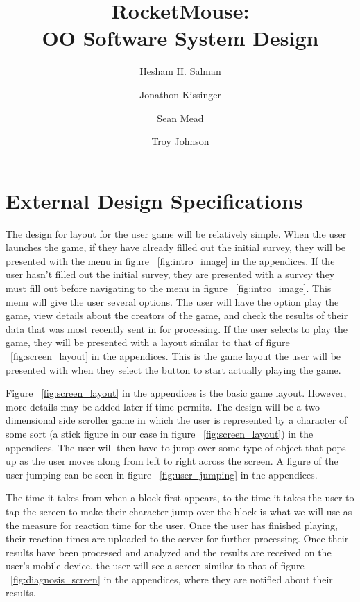 \documentclass[a4wide]{article}
\title{RocketMouse:\\ OO Software System Design}
\author{Hesham H. Salman \and Jonathon Kissinger \and Sean Mead \and Troy Johnson}
\begin{document}
\maketitle


\section{External Design Specifications}
The design for layout for the user game will be relatively simple. When the user launches the game, if they have already filled out the initial survey, they will be presented with the menu in figure ~\ref{fig:intro_image} in the appendices. If the user hasn't filled out the initial survey, they are presented with a survey they must fill out before navigating to the menu in figure ~\ref{fig:intro_image}. This menu will give the user several options. The user will have the option play the game, view details about the creators of the game, and check the results of their data that was most recently sent in for processing. If the user selects to play the game, they will be presented with a layout similar to that of figure ~\ref{fig:screen_layout} in the appendices. This is the game layout the user will be presented with when they select the button to start actually playing the game.



Figure ~\ref{fig:screen_layout} in the appendices is the basic game layout. However, more details may be added later if time permits. The design will be a two-dimensional side scroller game in which the user is represented by a character of some sort (a stick figure in our case in figure ~\ref{fig:screen_layout}) in the appendices. The user will then have to jump over some type of object that pops up as the user moves along from left to right across the screen. A figure of the user jumping can be seen in figure ~\ref{fig:user_jumping} in the appendices.



 The time it takes from when a block first appears, to the time it takes the user to tap the screen to make their character jump over the block is what we will use as the  measure for reaction time for the user. Once the user has finished playing, their reaction times are uploaded to the server for further processing. Once their results have been processed and analyzed and the results are received on the user's mobile device, the user will see a screen similar to that of figure ~\ref{fig:diagnosis_screen} in the appendices, where they are notified about their results.
\end{document}
